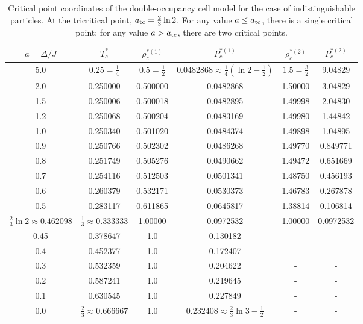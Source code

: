 \documentclass[pdflatex,sn-mathphys-num]{sn-jnl}%
\theoremstyle{thmstyleone}%
\theoremstyle{thmstyletwo}%
\theoremstyle{thmstylethree}%
\begin{document}
	\begin{table}[h]
	\centering
	\caption{Critical point coordinates of the double-occupancy cell model for the case of indistinguishable particles. At the tricritical point, $a_{\rm tc} = \frac{2}{3} \ln 2$. For any value $a \leq a_{\rm tc}$, there is a single critical point; for any value $a > a_{\rm tc}$, there are two critical points.}
		\begin{tabular}{c|c|c|c|c|c}
			\toprule
			$a=\Delta/J$ & $T^*_c$ & $\rho^{*(1)}_c $ & $P^{*(1)}_c$ & $\rho^{*(2)}_c$ & $P^{*(2)}_c$\\
			\midrule
			5.0 & $0.25 = \frac{1}{4}$ & $0.5 = \frac{1}{2}$ & $0.0482868 \approx \frac{1}{4}\left(\ln 2 - \frac{1}{2}\right)$ & $1.5 = \frac{3}{2}$ & 9.04829 \\
			2.0 & 0.250000 & 0.500000 & 0.0482868 & 1.50000 & 3.04829 \\
			1.5 & 0.250006 & 0.500018 & 0.0482895 & 1.49998 & 2.04830 \\
			1.2 & 0.250068 & 0.500204 & 0.0483169 & 1.49980 & 1.44842 \\
			1.0 & 0.250340 & 0.501020 & 0.0484374 & 1.49898 & 1.04895 \\
			0.9 & 0.250766 & 0.502302 & 0.0486268 & 1.49770 & 0.849771 \\
			0.8 & 0.251749 & 0.505276 & 0.0490662 & 1.49472 & 0.651669 \\
			0.7 & 0.254116 & 0.512503 & 0.0501341 & 1.48750 & 0.456193 \\
			0.6 & 0.260379  & 0.532171 & 0.0530373 & 1.46783 & 0.267878 \\
			0.5 & 0.283117 & 0.611865 & 0.0645817 & 1.38814 & 0.106814 \\
			$\frac{2}{3}\ln 2 \approx 0.462098$ & $\frac{1}{3} \approx 0.333333$ & 1.00000 & 0.0972532 & 1.00000 & 0.0972532\\
			0.45 & 0.378647 & 1.0 & 0.130182 & - & - \\
			0.4 & 0.452377 & 1.0 & 0.172407 & - & - \\
			0.3 & 0.532359 & 1.0 & 0.204622 & - & - \\
			0.2 & 0.587241 & 1.0 & 0.219645 & - & - \\
			0.1 & 0.630545 & 1.0 & 0.227849 & - & - \\
			0.0 & $\frac{2}{3} \approx 0.666667$  & 1.0 & $0.232408 \approx \frac{2}{3} \ln 3 - \frac{1}{2}$  & - & - \\
			\bottomrule
		\end{tabular}
		\label{tab:critical-points-ind}
	\end{table}
	
\end{document}
